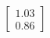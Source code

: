 \documentclass[preview]{standalone}
\begin{document}
\begin{align*}
\begin{bmatrix} 1.03 \\ 0.86 \end{bmatrix}
\end{align*}
\end{document}
